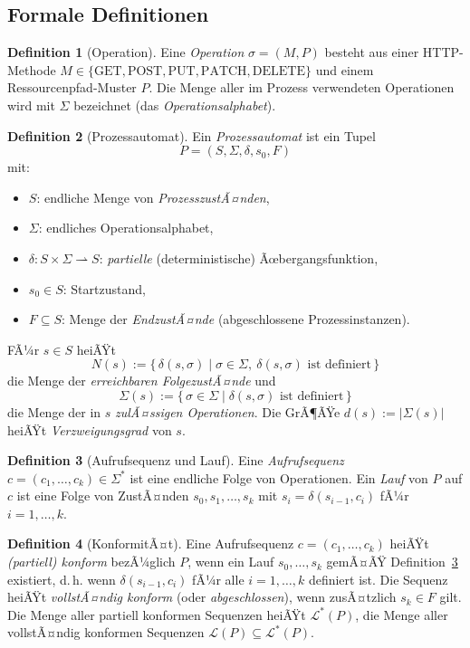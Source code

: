﻿\documentclass[a4paper,12pt]{article}
\theoremstyle{definition}
\newtheorem{definition}{Definition}
\begin{document}
\subsection{Formale Definitionen}

\begin{definition}[Operation]
	Eine \emph{Operation} $\sigma = (M, P)$ besteht aus einer HTTP-Methode
	$M \in \{\text{GET}, \text{POST}, \text{PUT}, \text{PATCH}, \text{DELETE}\}$ und einem
	Ressourcenpfad-Muster $P$. Die Menge aller im Prozess verwendeten Operationen wird mit
	$\Sigma$ bezeichnet (das \emph{Operationsalphabet}).
\end{definition}

\begin{definition}[Prozessautomat]
	\label{def:prozessautomat}
	Ein \emph{Prozessautomat} ist ein Tupel
	\[
		P = (S, \Sigma, \delta, s_0, F)
	\]
	mit:
	\begin{itemize}
		\item $S$: endliche Menge von \emph{ProzesszustÃ¤nden},
		\item $\Sigma$: endliches Operationsalphabet,
		\item $\delta: S \times \Sigma \rightharpoonup S$: \emph{partielle} (deterministische)
		      Ãœbergangsfunktion,
		\item $s_0 \in S$: Startzustand,
		\item $F \subseteq S$: Menge der \emph{EndzustÃ¤nde} (abgeschlossene Prozessinstanzen).
	\end{itemize}
	FÃ¼r $s \in S$ heiÃŸt
	\[
		N(s) := \{\, \delta(s,\sigma) \mid \sigma \in \Sigma,\ \delta(s,\sigma) \text{ ist definiert} \,\}
	\]
	die Menge der \emph{erreichbaren FolgezustÃ¤nde} und
	\[
		\Sigma(s) := \{\, \sigma \in \Sigma \mid \delta(s,\sigma) \text{ ist definiert} \,\}
	\]
	die Menge der in $s$ \emph{zulÃ¤ssigen Operationen}. Die GrÃ¶ÃŸe $d(s) := |\Sigma(s)|$
	heiÃŸt \emph{Verzweigungsgrad} von $s$.
\end{definition}

\begin{definition}[Aufrufsequenz und Lauf]
	\label{def:lauf}
	Eine \emph{Aufrufsequenz} $c = (c_1, \ldots, c_k) \in \Sigma^*$ ist eine endliche Folge
	von Operationen. Ein \emph{Lauf} von $P$ auf $c$ ist eine Folge von ZustÃ¤nden
	$s_0, s_1, \ldots, s_k$ mit $s_i = \delta(s_{i-1}, c_i)$ fÃ¼r $i = 1, \ldots, k$.
\end{definition}

\begin{definition}[KonformitÃ¤t]
	\label{def:konformitaet}
	Eine Aufrufsequenz $c = (c_1, \ldots, c_k)$ heiÃŸt \emph{(partiell) konform} bezÃ¼glich
	$P$, wenn ein Lauf $s_0, \ldots, s_k$ gemÃ¤ÃŸ Definition~\ref{def:lauf} existiert, d.\,h.
	wenn $\delta(s_{i-1}, c_i)$ fÃ¼r alle $i = 1, \ldots, k$ definiert ist. Die Sequenz heiÃŸt
	\emph{vollstÃ¤ndig konform} (oder \emph{abgeschlossen}), wenn zusÃ¤tzlich $s_k \in F$ gilt.
	Die Menge aller partiell konformen Sequenzen heiÃŸt $\mathcal{L}^*(P)$, die Menge aller
	vollstÃ¤ndig konformen Sequenzen $\mathcal{L}(P) \subseteq \mathcal{L}^*(P)$.
\end{definition}
\end{document}
